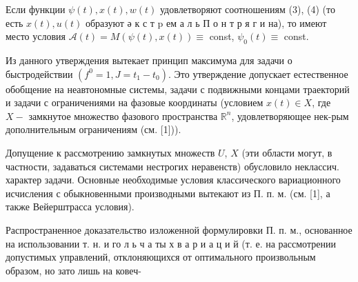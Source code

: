 \documentclass[10pt]{article}
\begin{document}
Если функции $\psi(t), x(t), w(t)$ удовлетворяют соотношениям (3), (4) (то есть $x(t), u(t)$ образуют ә к с т p ем а л ь П о н т р я г и на), то имеют место условия $\mathscr{A}(t)=M(\psi(t), x(t)) \equiv$ const, $\psi_{0}(t) \equiv$ const.



Из данного утверждения вытекает принцип максимума для задачи о быстродействии $\left(f^{0}=1, J=t_{1}-t_{0}\right)$. Это утверждение допускает естественное обобщение на неавтономные системы, задачи с подвижными концами траекторий и задачи с ограничениями на фазовые координаты (условием $x(t) \in X$, где $X-$ замкнутое множество фазового пространства $\mathbb{R}^{n}$, удовлетворяющее нек-рым дополнительным ограничениям (см. [1])).



Допущение к рассмотрению замкнутых множеств $U$, $X$ (эти области могут, в частности, задаваться системами нестрогих неравенств) обусловило неклассич. характер задачи. Основные необходимые условия классического вариационного исчисления с обыкновенными производными вытекают из П. п. м. (см. [1], а также Вейерштрасса условия).



Распространенное доказательство изложенной формулировки П. п. м., основанное на использовании т. н. и го л ь ч а ты х в а р и а ц и й (т. е. на рассмотрении допустимых управлений, отклоняющихся от оптимального произвольным образом, но зато лишь на ковеч-
\end{document}
